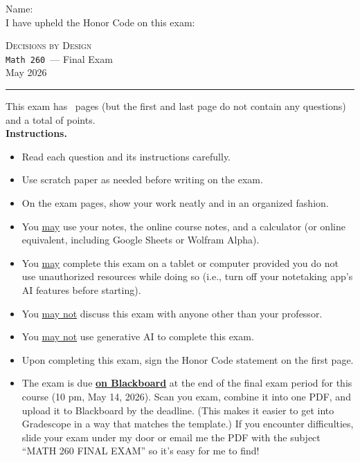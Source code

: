 \documentclass[12pt,addpoints]{exam}
\newcommand{\coursename}{Decisions by Design}
\newcommand{\coursenumber}{{\tt Math 260}}
\newcommand{\examname}{Final Exam}
\newcommand{\examdate}{May 2026}
\begin{document}
\thispagestyle{empty}
\noindent Name: \hrulefill\\[1em]
\noindent I have upheld the Honor Code on this exam: \hrulefill\\


\bigskip

\noindent\hrulefill
\bigskip
\begin{center}
\large \textsc{\coursename} \\
\smallskip
\normalsize \coursenumber\ --- \examname\\
\smallskip
\examdate
\end{center}
\bigskip
\hrule


\vspace{20pt}

\noindent This exam has \numpages\ pages (but the first and last page do not contain any questions) and a total of  points.\\


\noindent \textbf{Instructions.}
\begin{itemize}
  \setlength{\itemindent}{-1em}
	\item Read each question and its instructions carefully.
	\item Use scratch paper as needed before writing on the exam.
	\item On the exam pages, show your work neatly and in an organized fashion.
  \item You \underline{may} use your notes, the online course notes, and a calculator (or online equivalent, including Google Sheets or Wolfram Alpha).
  \item You \underline{may} complete this exam on a tablet or computer provided you do not use unauthorized resources while doing so (i.e., turn off your notetaking app's AI features before starting).
  \item You \underline{may not} discuss this exam with anyone other than your professor.
	\item You \underline{may not} use generative AI to complete this exam.
  \item Upon completing this exam, sign the Honor Code statement on the first page.
  \item The exam is due \textbf{\underline{on Blackboard}} at the end of the final exam period for this course (10 pm, May 14, 2026). Scan you exam, combine it into one PDF, and upload it to Blackboard by the deadline. (This makes it easier to get into Gradescope in a way that matches the template.) If you encounter difficulties, slide your exam under my door or email me the PDF with the subject ``MATH 260 FINAL EXAM'' so it's easy for me to find!
\end{itemize} 
\end{document}
